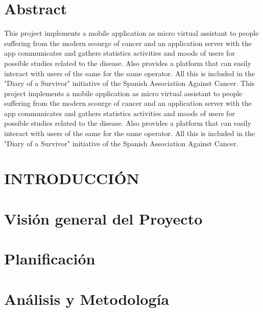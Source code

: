 \documentclass[b5paper,10pt,twoside]{book}
\begin{document}
	\chapter*{Abstract}
	 	This project implements a mobile application as micro virtual assistant to people suffering from the modern scourge of cancer and an application server with the app communicates and gathers statistics activities and moods of users for possible studies related to the disease. Also provides a platform that can easily interact with users of the same for the same operator. All this is included in the "Diary of a Survivor" initiative of the Spanish Association Against Cancer. This project implements a mobile application as micro virtual assistant to people suffering from the modern scourge of cancer and an application server with the app communicates and gathers statistics activities and moods of users for possible studies related to the disease. Also provides a platform that can easily interact with users of the same for the same operator. All this is included in the "Diary of a Survivor" initiative of the Spanish Association Against Cancer.\cite{SHAREESP}
	
	\tableofcontents
	
	\listoffigures
	
	\listoftables
	

	\chapter{INTRODUCCIÓN}
	
	
	
	\chapter{Visión general del Proyecto}

	
	
	\chapter{Planificación}
	
	
	
	\chapter{Análisis y Metodología}
	
	
	
\end{document}
